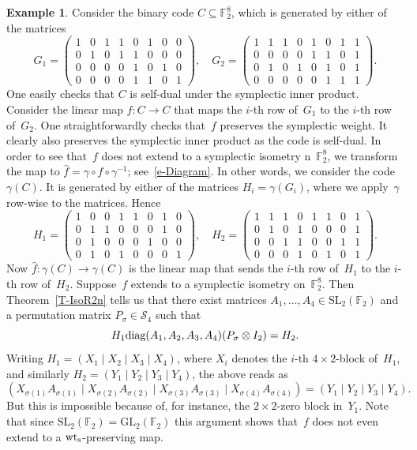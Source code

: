 \documentclass[11pt]{article}
\theoremstyle{definition}
\newtheorem{exa}[theo]{Example}
\numberwithin{equation}{section}
\newcommand{\F}{{\mathbb F}}
\newcommand{\cS}{{\mathcal S}}
\newcommand{\wts}{\mbox{${\rm wt}_{\rm s}$}}
\newcommand{\GL}{\mathrm{GL}}
\newcommand{\SL}{\mathrm{SL}}
\newcommand{\diag}{\textup{diag}}
\begin{document}
\begin{exa}\label{E-NonExt}
Consider the binary code $C\subseteq\F_2^8$, which is generated by either of the matrices
\[
   G_1=\left(\!\!\begin{array}{cccc|cccc}
               1&0&1&1&0&1&0&0\\0&1&0&1&1&0&0&0\\0&0&0&0&1&0&1&0\\0&0&0&0&1&1&0&1\end{array}\!\!\right),\quad
   G_2=\left(\!\!\begin{array}{cccc|cccc}
               1&1&1&0&1&0&1&1\\0&0&0&0&1&1&0&1\\0&1&0&1&0&1&0&1\\0&0&0&0&0&1&1&1\end{array}\!\!\right).
\]
One easily checks that $C$ is self-dual under the symplectic inner product.
Consider the linear map $f:C\longrightarrow C$ that maps the $i$-th row of~$G_1$ to the $i$-th row of~$G_2$.
One straightforwardly checks that~$f$ preserves the symplectic weight.
It clearly also preserves the symplectic inner product as the code is self-dual.
In order to see that~$f$ does not extend to a symplectic isometry n~$\F_2^8$, we transform the map to
$\hat{f}=\gamma\circ f\circ\gamma^{-1}$; see~\eqref{e-Diagram}.
In other words, we consider the code $\gamma(C)$.
It is generated by either of the matrices $H_i=\gamma(G_i)$, where we apply~$\gamma$ row-wise to the matrices.
Hence
\[
H_1 = \left(\!\!
	\begin{array}{cc|cc|cc|cc}
    1 & 0 & 0 & 1 & 1 & 0 & 1 & 0 \\
    0 & 1 & 1 & 0 & 0 & 0 & 1 & 0 \\
    0 & 1 & 0 & 0 & 0 & 1 & 0 & 0 \\
    0 & 1 & 0 & 1 & 0 & 0 & 0 & 1
	\end{array}\!\!\right), \quad
H_2 = \left(\!\!\begin{array}{cc|cc|cc|cc}
    1 & 1 & 1 & 0 & 1 & 1 & 0 & 1 \\
    0 & 1 & 0 & 1 & 0 & 0 & 0 & 1 \\
    0 & 0 & 1 & 1 & 0 & 0 & 1 & 1 \\
    0 & 0 & 0 & 1 & 0 & 1 & 0 & 1
    \end{array}\!\!\right).
\]
Now $\hat{f}:\gamma(C)\longrightarrow \gamma(C)$ is the linear map that sends the $i$-th row of~$H_1$ to the $i$-th row of~$H_2$.
Suppose~$f$ extends to a symplectic isometry on~$\F_2^8$.
Then Theorem~\ref{T-IsoR2n} tells us that there exist matrices $A_1,\ldots,A_4\in\SL_2(\F_2)$ and a permutation
matrix $P_{\sigma}\in\cS_4$ such that
\[
    H_1\diag(A_1,A_2,A_3,A_4)(P_{\sigma}\otimes I_2)=H_2.
\]
Writing $H_1=(X_1\mid X_2\mid X_3\mid X_4)$, where $X_i$ denotes the $i$-th $4\times 2$-block of~$H_1$, and similarly
$H_2=(Y_1\mid Y_2\mid Y_3\mid Y_4)$, the above reads as
\[
  (X_{\sigma(1)}A_{\sigma(1)}\mid X_{\sigma(2)}A_{\sigma(2)}\mid X_{\sigma(3)}A_{\sigma(3)}\mid
      X_{\sigma(4)}A_{\sigma(4)})=(Y_1\mid Y_2\mid Y_3\mid Y_4).
\]
But this is impossible because of, for instance, the $2\times 2$-zero block in~$Y_1$.
Note that since $\SL_2(\F_2)=\GL_2(\F_2)$ this argument shows that~$f$ does not even extend to a
$\wts$-preserving map.
\end{exa}
\end{document}
